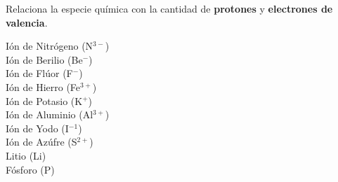 Relaciona la especie química con la cantidad de \textbf{protones} y \textbf{electrones de valencia}.

\begin{multicols}{2}
    \begin{choices}
        \choice Ión de Nitrógeno (N$^{3-}$) \\  
        \choice Ión de Berilio (Be$^{-}$) \\  
        \choice Ión de Flúor   (F$^-$) \\  
        \choice Ión de Hierro (Fe$^{3+}$)  \\  
        \choice Ión de Potasio (K$^+$) \\ 
        \columnbreak
        \choice Ión de Aluminio  (Al$^{3+}$) \\ 
        \choice Ión de Yodo (I$^{-1}$) \\ 
        \choice Ión de Azúfre (S$^{2+}$) \\ 
        \choice Litio (Li) \\ 
        \choice Fósforo (P)    \\  
    \end{choices}
\end{multicols}
